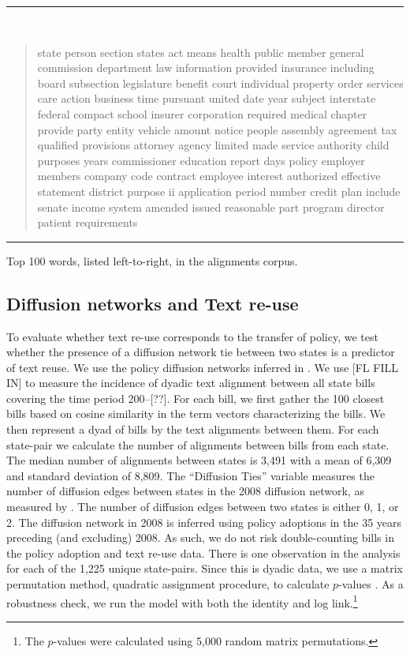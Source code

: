 \documentclass[12pt]{article} %
\begin{document}
\begin{table}[ht]
\rule{\textwidth}{1pt} \\ \vspace{-1cm}
\begin{quotation}
\noindent state person section states act means health public member general commission department law information provided insurance including board subsection legislature benefit court individual property order services care action business time pursuant united date year subject interstate federal compact school insurer corporation required medical chapter provide party entity vehicle amount notice people assembly agreement tax qualified provisions attorney agency limited made service authority child purposes years commissioner education report days policy employer members company code contract employee interest authorized effective statement district purpose ii application period number credit plan include senate income system amended issued reasonable part program director patient requirements
\end{quotation} \vspace{-.5cm}
\rule{\textwidth}{1pt} \vspace{-.2cm}
\caption{Top 100 words, listed left-to-right, in the alignments corpus.}
\label{tab:top100words}
\end{table}




\subsection{Diffusion networks and Text re-use}

To evaluate whether text re-use corresponds to the transfer of policy, we test whether the presence of a diffusion network tie between two states is a predictor of text reuse. We use the policy diffusion networks inferred in \citet{desmarais2015}. We use [FL FILL IN] to measure the incidence of dyadic text alignment between all state bills covering the time period 200--[??]. For each bill, we first gather the 100 closest bills based on cosine similarity in the term vectors characterizing the bills. We then represent a dyad of bills by the text alignments between them. For each state-pair we calculate the number of alignments between bills from each state. The median number of alignments between states is 3,491 with a mean of 6,309 and standard deviation of 8,809. The ``Diffusion Ties'' variable measures the number of diffusion edges between states in the 2008 diffusion network, as measured by \citet{desmarais2015}. The number of diffusion edges between two states is either 0, 1, or 2. The diffusion network in 2008 is inferred using policy adoptions in the 35 years preceding (and excluding) 2008. As such, we do not risk double-counting bills in the policy adoption and text re-use data. There is one observation in the analysis for each of the 1,225 unique state-pairs. Since this is dyadic data, we use a matrix permutation method, quadratic assignment procedure, to calculate $p$-values \citep{krackhardt1988}. As a robustness check, we run the model with both the identity and log link.\footnote{The $p$-values were calculated using 5,000 random matrix permutations.}
\end{document}
